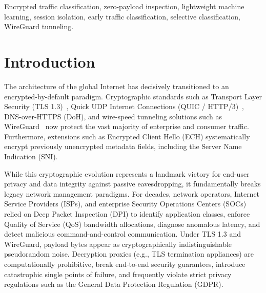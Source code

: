 \documentclass[conference]{IEEEtran}
\begin{document}
\begin{abstract}
achieves 0.6111 Macro-F1 in 79.94~ms, while retrospective full-flow analysis requires $\approx 59.7$~seconds and completely fails; and (5) A validation-calibrated selective abstention policy ($\tau^* = 0.70$) monotonically reduces error among accepted test flows from 45.83\% down to 26.92\% at 54.17\% flow coverage. We provide an exhaustive discussion of operational boundaries, closed-world limitations, and a fully verifiable artifact package.
\end{abstract}

\begin{IEEEkeywords}
Encrypted traffic classification, zero-payload inspection, lightweight machine learning, session isolation, early traffic classification, selective classification, WireGuard tunneling.
\end{IEEEkeywords}

\section{Introduction}
\label{sec:intro}

The architecture of the global Internet has decisively transitioned to an encrypted-by-default paradigm. Cryptographic standards such as Transport Layer Security (TLS 1.3)~\cite{rescorla2018tls}, Quick UDP Internet Connections (QUIC / HTTP/3)~\cite{iyengar2021quic}, DNS-over-HTTPS (DoH), and wire-speed tunneling solutions such as WireGuard~\cite{donenfeld2017wireguard} now protect the vast majority of enterprise and consumer traffic. Furthermore, extensions such as Encrypted Client Hello (ECH) systematically encrypt previously unencrypted metadata fields, including the Server Name Indication (SNI).

While this cryptographic evolution represents a landmark victory for end-user privacy and data integrity against passive eavesdropping, it fundamentally breaks legacy network management paradigms. For decades, network operators, Internet Service Providers (ISPs), and enterprise Security Operations Centers (SOCs) relied on Deep Packet Inspection (DPI) to identify application classes, enforce Quality of Service (QoS) bandwidth allocations, diagnose anomalous latency, and detect malicious command-and-control communication. Under TLS 1.3 and WireGuard, payload bytes appear as cryptographically indistinguishable pseudorandom noise. Decryption proxies (e.g., TLS termination appliances) are computationally prohibitive, break end-to-end security guarantees, introduce catastrophic single points of failure, and frequently violate strict privacy regulations such as the General Data Protection Regulation (GDPR).
\end{document}
